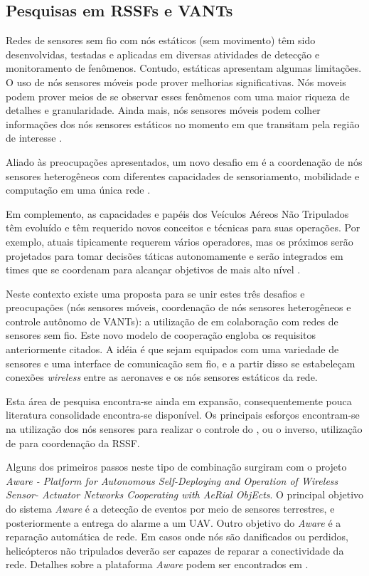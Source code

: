 \subsection{Pesquisas em RSSFs e VANTs}

Redes de sensores sem fio com nós estáticos (sem movimento) têm sido desenvolvidas, testadas e aplicadas em diversas atividades de detecção e monitoramento de fenômenos.
Contudo, \rssfs estáticas apresentam algumas limitações. O uso de nós sensores móveis pode prover melhorias significativas. Nós moveis podem prover meios de se observar esses fenômenos
com uma maior riqueza de detalhes e granularidade. Ainda mais, nós sensores móveis podem colher informações dos nós sensores estáticos no momento em que transitam
 pela região de interesse \cite{Aware}. 

Aliado às preocupações apresentados, um novo desafio em \rssfs é a coordenação de nós sensores heterogêneos com diferentes capacidades de sensoriamento, mobilidade e computação em uma única rede \cite{Freitas2009}. 

Em complemento, as capacidades e papéis dos Veículos Aéreos Não Tripulados têm evoluído e têm requerido novos conceitos e técnicas para suas operações. Por exemplo, \vants atuais tipicamente requerem vários operadores, mas os próximos \vants serão projetados para tomar decisões táticas autonomamente e serão integrados em times que se coordenam para alcançar objetivos de mais alto nível \cite{Richards2002, Mehdi2003}. 

Neste contexto existe uma proposta para se unir estes três desafios e preocupações (nós sensores móveis, coordenação de nós sensores heterogêneos e controle autônomo de VANTs): a utilização de \uavs em colaboração com redes de sensores sem fio. Este novo modelo de cooperação engloba os requisitos anteriormente citados. A idéia é que \vants sejam equipados com uma variedade de sensores e uma interface de comunicação sem fio, e a partir disso se estabeleçam conexões \emph{wireless} entre as aeronaves e os nós sensores estáticos da rede. 

Esta área de pesquisa encontra-se ainda em expansão, consequentemente pouca literatura consolidade encontra-se disponível. Os principais esforços encontram-se na utilização dos nós sensores para realizar o controle do \vant, ou o inverso, utilização de \vants para coordenação da RSSF.


Alguns dos primeiros passos neste tipo de combinação surgiram com o projeto \emph{Aware - Platform for Autonomous Self-Deploying and Operation of Wireless Sensor-
Actuator Networks Cooperating with AeRial ObjEcts}. O principal objetivo do sistema \emph{Aware} é a detecção de eventos por meio de sensores terrestres, e posteriormente a entrega do alarme a um UAV. Outro objetivo do \emph{Aware} é a reparação automática de rede. Em casos onde nós são danificados ou perdidos, helicópteros não tripulados deverão ser capazes de reparar a conectividade da rede. Detalhes sobre a plataforma \emph{Aware} podem ser encontrados em \cite{Aware, Aware2}.


